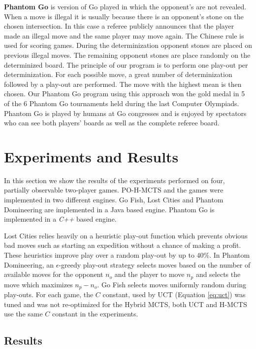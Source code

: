\documentclass[a4paper]{llncs}
\begin{document}
{\sc \bf Phantom Go} is version of Go played in which the opponent's are not revealed. When a move is illegal it is usually because there is an opponent's stone on the chosen intersection. In this case a referee publicly announces that the player made an illegal move and the same player may move again. The Chinese rule is used for scoring games. During the determinization opponent stones are placed on previous illegal moves. The remaining opponent stones are place randomly on the determinized board. The principle of our program is to perform one play-out per determinization. For each possible move, a great number of determinization followed by a play-out are performed. The move with the highest mean is then chosen. Our Phantom Go program using this approach won the gold medal in 5 of the 6 Phantom Go tournaments held during the last Computer Olympiads. Phantom Go is played by humans at Go congresses and is enjoyed by spectators who can see both players' boards as well as the complete referee board.

\section{Experiments and Results}
\label{sec:exp_res}
In this section we show the results of the experiments performed on four, partially observable two-player games. PO-H-MCTS and the games were implemented in two different engines. Go Fish, Lost Cities and Phantom Domineering are implemented in a Java based engine. Phantom Go is implemented in a \emph{C++} based engine.

Lost Cities relies heavily on a heuristic play-out function which prevents obvious bad moves such as starting an expedition without a chance of making a profit. These heuristics improve play over a random play-out by up to $40\%$.
In Phantom Domineering, an $\epsilon$-greedy play-out strategy selects moves based on the number of available moves for the opponent $n_o$ and the player to move $n_p$ and selects the move which maximizes $n_p - n_o$.
Go Fish selects moves uniformly random during play-outs.
For each game, the $C$ constant, used by UCT (Equation \ref{eq:uct}) was tuned and was not re-optimized for the Hybrid MCTS, both UCT and H-MCTS use the same $C$ constant in the experiments.

\subsection{Results}
\label{subsec:results}
\end{document}
